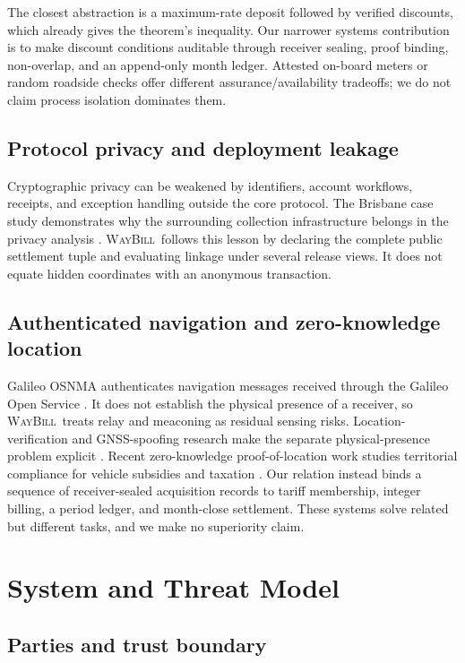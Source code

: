 \documentclass[conference]{IEEEtran}
\theoremstyle{plain}
\theoremstyle{definition}
\newcommand{\system}{\textsc{WayBill}}
\begin{document}
The closest abstraction is a maximum-rate deposit followed by verified
discounts, which already gives the theorem's inequality. Our narrower systems
contribution is to make discount conditions auditable through receiver sealing,
proof binding, non-overlap, and an append-only month ledger. Attested on-board
meters or random roadside checks offer different assurance/availability
tradeoffs; we do not claim process isolation dominates them.

\subsection{Protocol privacy and deployment leakage}

Cryptographic privacy can be weakened by identifiers, account workflows,
receipts, and exception handling outside the core protocol. The Brisbane case
study demonstrates why the surrounding collection infrastructure belongs in
the privacy analysis \cite{Jolfaei2024Brisbane}. \system\ follows this lesson
by declaring the complete public settlement tuple and evaluating linkage under
several release views. It does not equate hidden coordinates with an anonymous
transaction.

\subsection{Authenticated navigation and zero-knowledge location}

Galileo OSNMA authenticates navigation messages received through the Galileo
Open Service \cite{GalileoOSNMA2025}. It does not establish the physical
presence of a receiver, so \system\ treats relay and meaconing as residual
sensing risks. Location-verification and GNSS-spoofing research make the
separate physical-presence problem explicit
\cite{Sastry2003Location,Psiaki2016GNSS}. Recent zero-knowledge proof-of-location work studies
territorial compliance for vehicle subsidies and taxation
\cite{Bogdanov2025ZKLocation}. Our relation instead binds a sequence of
receiver-sealed acquisition records to tariff membership, integer billing, a
period ledger, and month-close settlement. These systems solve related but
different tasks, and we make no superiority claim.

\section{System and Threat Model}

\subsection{Parties and trust boundary}
\end{document}
